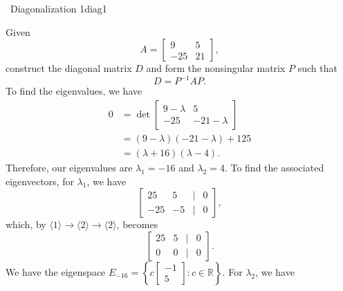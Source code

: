         \begin{example}{\Difficulty\,\Difficulty\,\,Diagonalization 1}{diag1}

            Given
            \begin{equation*}
                A=\begin{bmatrix}
                    9 & 5 \\ 
                    -25 & 21
                \end{bmatrix},
            \end{equation*}
            construct the diagonal matrix \(D\) and form the nonsingular matrix \(P\) such that
            \begin{equation*}
                D=P^{-1}AP.
            \end{equation*}
            To find the eigenvalues, we have
            \begin{align*}
                0&=\det\begin{bmatrix}
                    9-\lambda & 5 \\
                    -25 & -21-\lambda
                \end{bmatrix} \\
                &=(9-\lambda)(-21-\lambda)+125 \\
                &=(\lambda+16)(\lambda-4).
            \end{align*}
            Therefore, our eigenvalues are \(\lambda_1=-16\) and \(\lambda_2=4\). To find the associated eigenvectors, for \(\lambda_1\), we have
            \begin{equation*}
                \begin{bmatrix}
                    25 & 5 & | & 0 \\
                    -25 & -5 & | & 0
                \end{bmatrix},
            \end{equation*}
            which, by \(\langle1\rangle\to\langle2\rangle\to\langle2\rangle\), becomes
            \begin{equation*}
                \begin{bmatrix}
                    25 & 5 & | & 0 \\
                    0 & 0 & | & 0
                \end{bmatrix}.
            \end{equation*}
            We have the eigenspace \(E_{-16}=\left\{c\begin{bmatrix} -1 \\ 5 \end{bmatrix}:c\in\mathbb{R}\right\}\). For \(\lambda_2\), we have

\end{example}
